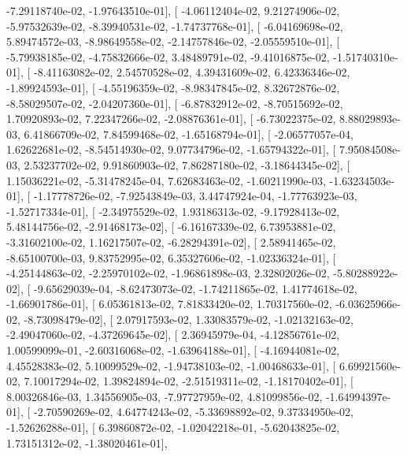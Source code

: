 \documentclass{article}
\begin{document}
         -7.29118740e-02,  -1.97643510e-01],
       [ -4.06112404e-02,   9.21274906e-02,  -5.97532639e-02,
         -8.39940531e-02,  -1.74737768e-01],
       [ -6.04169698e-02,   5.89474572e-03,  -8.98649558e-02,
         -2.14757846e-02,  -2.05559510e-01],
       [ -5.79938185e-02,  -4.75832666e-02,   3.48489791e-02,
         -9.41016875e-02,  -1.51740310e-01],
       [ -8.41163082e-02,   2.54570528e-02,   4.39431609e-02,
          6.42336346e-02,  -1.89924593e-01],
       [ -4.55196359e-02,  -8.98347845e-02,   8.32672876e-02,
         -8.58029507e-02,  -2.04207360e-01],
       [ -6.87832912e-02,  -8.70515692e-02,   1.70920893e-02,
          7.22347266e-02,  -2.08876361e-01],
       [ -6.73022375e-02,   8.88029893e-03,   6.41866709e-02,
          7.84599468e-02,  -1.65168794e-01],
       [ -2.06577057e-04,   1.62622681e-02,  -8.54514930e-02,
          9.07734796e-02,  -1.65794322e-01],
       [  7.95084508e-03,   2.53237702e-02,   9.91860903e-02,
          7.86287180e-02,  -3.18644345e-02],
       [  1.15036221e-02,  -5.31478245e-04,   7.62683463e-02,
         -1.60211990e-03,  -1.63234503e-01],
       [ -1.17778726e-02,  -7.92543849e-03,   3.44747924e-04,
         -1.77763923e-03,  -1.52717334e-01],
       [ -2.34975529e-02,   1.93186313e-02,  -9.17928413e-02,
          5.48144756e-02,  -2.91468173e-02],
       [ -6.16167339e-02,   6.73953881e-02,  -3.31602100e-02,
          1.16217507e-02,  -6.28294391e-02],
       [  2.58941465e-02,  -8.65100700e-03,   9.83752995e-02,
          6.35327606e-02,  -1.02336324e-01],
       [ -4.25144863e-02,  -2.25970102e-02,  -1.96861898e-03,
          2.32802026e-02,  -5.80288922e-02],
       [ -9.65629039e-04,  -8.62473073e-02,  -1.74211865e-02,
          1.41774618e-02,  -1.66901786e-01],
       [  6.05361813e-02,   7.81833420e-02,   1.70317560e-02,
         -6.03625966e-02,  -8.73098479e-02],
       [  2.07917593e-02,   1.33083579e-02,  -1.02132163e-02,
         -2.49047060e-02,  -4.37269645e-02],
       [  2.36945979e-04,  -4.12856761e-02,   1.00599099e-01,
         -2.60316068e-02,  -1.63964188e-01],
       [ -4.16944081e-02,   4.45528383e-02,   5.10099529e-02,
         -1.94738103e-02,  -1.00468633e-01],
       [  6.69921560e-02,   7.10017294e-02,   1.39824894e-02,
         -2.51519311e-02,  -1.18170402e-01],
       [  8.00326846e-03,   1.34556905e-03,  -7.97727959e-02,
          4.81099856e-02,  -1.64994397e-01],
       [ -2.70590269e-02,   4.64774243e-02,  -5.33698892e-02,
          9.37334950e-02,  -1.52626288e-01],
       [  6.39860872e-02,  -1.02042218e-01,  -5.62043825e-02,
          1.73151312e-02,  -1.38020461e-01],
\end{document}
